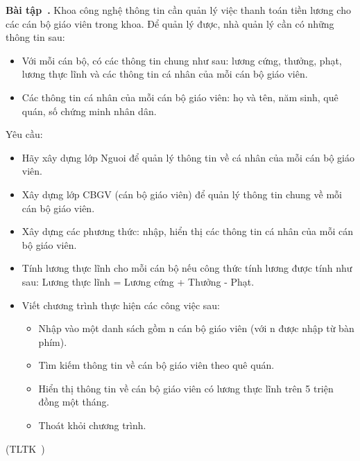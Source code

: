 \documentclass[12pt,a4paper]{article}
\newcounter{exercise}[section]
\newenvironment{exercise}[1][]{\refstepcounter{exercise}\par\medskip\textbf{Bài tập~\theexercise. #1} \rmfamily}{\medskip}
\newcommand{\reference}[1]{(TLTK~#1)}
\begin{document}
    \begin{exercise}
        Khoa công nghệ thông tin cần quản lý việc thanh toán tiền lương cho các cán bộ giáo viên trong khoa. Để quản lý được, nhà quản lý cần có những thông tin sau:
            \begin{itemize}
                \item Với mỗi cán bộ, có các thông tin chung như sau: lương cứng, thưởng, phạt, lương thực lĩnh và các thông tin cá nhân của mỗi cán bộ giáo viên.
                \item Các thông tin cá nhân của mỗi cán bộ giáo viên: họ và tên, năm sinh, quê quán, số chứng minh nhân dân.
            \end{itemize}

        Yêu cầu:
            \begin{itemize}
                \item Hãy xây dựng lớp Nguoi để quản lý thông tin về cá nhân của mỗi cán bộ giáo viên.
                \item Xây dựng lớp CBGV (cán bộ giáo viên) để quản lý thông tin chung về mỗi cán bộ giáo viên.
                \item Xây dựng các phương thức: nhập, hiển thị các thông tin cá nhân của mỗi cán bộ giáo viên.
                \item Tính lương thực lĩnh cho mỗi cán bộ nếu công thức tính lương được tính như sau: Lương thực lĩnh = Lương cứng + Thưởng - Phạt.
                \item Viết chương trình thực hiện các công việc sau:
                    \begin{itemize}
                        \item Nhập vào một danh sách gồm n cán bộ giáo viên (với n được nhập từ bàn phím).
                        \item Tìm kiếm thông tin về cán bộ giáo viên theo quê quán.
                        \item Hiển thị thông tin về cán bộ giáo viên có lương thực lĩnh trên 5 triện đồng một tháng.
                        \item Thoát khỏi chương trình.
                    \end{itemize}
            \end{itemize}

            \reference{\cite{123doc.org}}
    \end{exercise}
\end{document}
